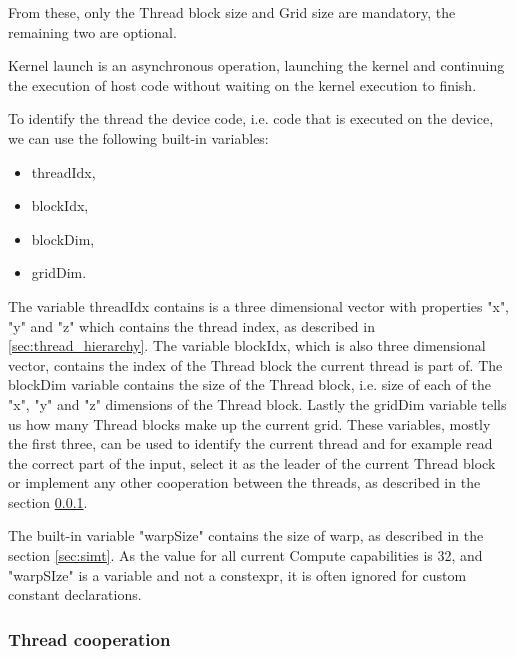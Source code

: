 From these, only the Thread block size and Grid size are mandatory, the remaining two are optional.

Kernel launch is an asynchronous operation, launching the kernel and continuing the execution of host code without waiting on the kernel execution to finish.  

To identify the thread the device code, i.e. code that is executed on the device, we can use the following built-in variables:

\begin{itemize}
	\item threadIdx,
	\item blockIdx,
	\item blockDim,
	\item gridDim.
\end{itemize}

The variable threadIdx contains is a three dimensional vector with properties "x", "y" and "z" which contains the thread index, as described in \ref{sec:thread_hierarchy}. The variable blockIdx, which is also three dimensional vector, contains the index of the Thread block the current thread is part of. The blockDim variable contains the size of the Thread block, i.e. size of each of the "x", "y" and "z" dimensions of the Thread block. Lastly the gridDim variable tells us how many Thread blocks make up the current grid. These variables, mostly the first three, can be used to identify the current thread and for example read the correct part of the input, select it as the leader of the current Thread block or implement any other cooperation between the threads, as described in the section \ref{sec:thread_cooperation}.

The built-in variable "warpSize" contains the size of warp, as described in the section \ref{sec:simt}. As the value for all current Compute capabilities is 32, and "warpSIze" is a variable and not a constexpr, it is often ignored for custom constant declarations.


\subsubsection{Thread cooperation}
\label{sec:thread_cooperation}


